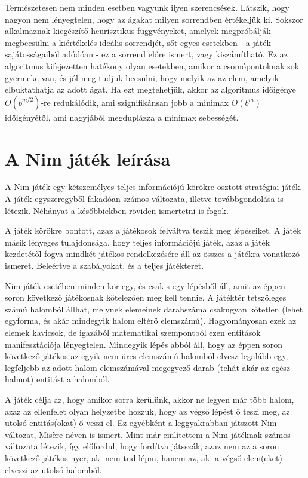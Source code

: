 Természetesen nem minden esetben vagyunk ilyen szerencsések. Látszik, hogy nagyon nem lényegtelen, hogy az ágakat milyen sorrendben értékeljük ki. Sokszor alkalmaznak kiegészítő heurisztikus függvényeket, amelyek megpróbálják megbecsülni a kiértékelés ideális sorrendjét, sőt egyes esetekben - a játék sajátosságaiból adódóan - ez a sorrend előre ismert, vagy kiszámítható. Ez az algoritmus kifejezetten hatékony olyan esetekben, amikor a csomópontoknak sok gyermeke van, és jól meg tudjuk becsülni, hogy melyik az az elem, amelyik elbuktathatja az adott ágat. Ha ezt megtehetjük, akkor az algoritmus időigénye $O(b^{m/2})$-re redukálódik, ami szignifikánsan jobb a minimax $O(b^m)$ időigényétől, ami nagyjából megduplázza a minimax sebességét.\ujsor

\section{A Nim játék leírása}
A Nim játék egy kétszemélyes teljes információjú körökre osztott stratégiai játék. A játék egyszeregyből fakadóan számos változata, illetve továbbgondolása is létezik. Néhányat a későbbiekben röviden ismertetni is fogok. \ujsor

A játék körökre bontott, azaz a játékosok felváltva teszik meg lépéseiket. A játék másik lényeges tulajdonsága, hogy teljes információjú játék, azaz a játék kezdetétől fogva mindkét játékos rendelkezésére áll az összes a játékra vonatkozó ismeret. Beleértve a szabályokat, és a teljes játékteret.\ujsor

Nim játék esetében minden kör egy, és csakis egy lépésből áll, amit az éppen soron következő játékosnak kötelezően meg kell tennie. A játéktér tetszőleges számú halomból állhat, melynek elemeinek darabszáma csakugyan kötetlen (lehet egyforma, és akár mindegyik halom eltérő elemszámú). Hagyományosan ezek az elemek kavicsok, de igazából matematikai szempontból ezen entitások manifesztációja lényegtelen. Mindegyik lépés abból áll, hogy az éppen soron következő játékos az egyik nem üres elemszámú halomból elvesz legalább egy, legfeljebb az adott halom elemszámával megegyező darab (tehát akár az egész halmot) entitást a halomból.\ujsor

A játék célja az, hogy amikor sorra kerülünk, akkor ne legyen már több halom, azaz az ellenfelet olyan helyzetbe hozzuk, hogy az végső lépést õ teszi meg, az utolsó entitás(okat) ő veszi el. Ez egyébként a leggyakrabban játszott Nim változat, Misère néven is ismert. Mint már említettem a Nim játéknak számos változata létezik, így előfordul, hogy fordítva játsszák, azaz nem az a soron következő játékos nyer, aki nem tud lépni, hanem az, aki a végső elem(eket) elveszi az utolsó halomból.\ujsor



